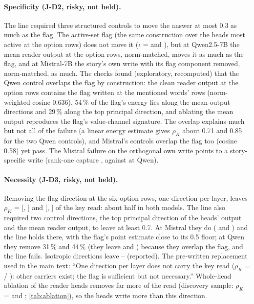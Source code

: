 \paragraph{Specificity (J-D2, risky, not held).} The line required three structured controls to move the answer at most 0.3 as much as the flag. The active-set flag (the same construction over the heads most active at the option rows) does not move it ($\iota$ = \JdTwoIotaActiveQwenSeven{} and \JdTwoIotaActiveMistralSeven{}), but at Qwen2.5-7B the mean reader output at the option rows, norm-matched, moves it \JdTwoRatioMeanHQwenSeven{} as much as the flag, and at Mistral-7B the story's own write with its flag component removed, norm-matched, \JdTwoRatioOrthMistralSeven{} as much. The checks found (exploratory, recomputed) that the Qwen control overlaps the flag by construction: the clean reader output at the option rows contains the flag written at the mentioned words' rows (norm-weighted cosine 0.636), 54\,\% of the flag's energy lies along the mean-output directions and 29\,\% along the top principal direction, and ablating the mean output reproduces the flag's value-channel signature. The overlap explains much but not all of the failure (a linear energy estimate gives $\rho_K$ about 0.71 and 0.85 for the two Qwen controls), and Mistral's controls overlap the flag too (cosine 0.58) yet pass. The Mistral failure on the orthogonal own write points to a story-specific write (rank-one capture \JdRankOneMistralSeven{}, against \JdRankOneQwenSeven{} at Qwen). %

\paragraph{Necessity (J-D3, risky, not held).} Removing the flag direction at the six option rows, one direction per layer, leaves $\rho_K$ = \JdThreeRhoFlagQwenSeven{} [\JdThreeRhoFlagQwenSevenLo{}, \JdThreeRhoFlagQwenSevenHi{}] and \JdThreeRhoFlagMistralSeven{} [\JdThreeRhoFlagMistralSevenLo{}, \JdThreeRhoFlagMistralSevenHi{}] of the key read: about half in both models. The line also required two control directions, the top principal direction of the heads' output and the mean reader output, to leave at least 0.7. At Mistral they do (\JdThreeRhoPconeMistralSeven{} and \JdThreeRhoMeanHMistralSeven{}) and the line holds there, with the flag's point estimate close to its 0.5 floor; at Qwen they remove 31\,\% and 44\,\% (they leave \JdThreeRhoPconeQwenSeven{} and \JdThreeRhoMeanHQwenSeven{}) because they overlap the flag, and the line fails. %
 Isotropic directions leave \JdRhoIsoMin{}--\JdRhoIsoMax{} (reported). The pre-written replacement used in the main text: ``One direction per layer does not carry the key read ($\rho_K$ = \JdThreeRhoFlagQwenSeven{} / \JdThreeRhoFlagMistralSeven{}): other carriers exist; the flag is sufficient but not necessary.'' Whole-head ablation of the reader heads removes far more of the read (discovery sample: $\rho_K$ = \HthreeRhoQwenSeven{} and \HthreeRhoMistralSeven{}; \cref{tab:ablation}), so the heads write more than this direction. %


